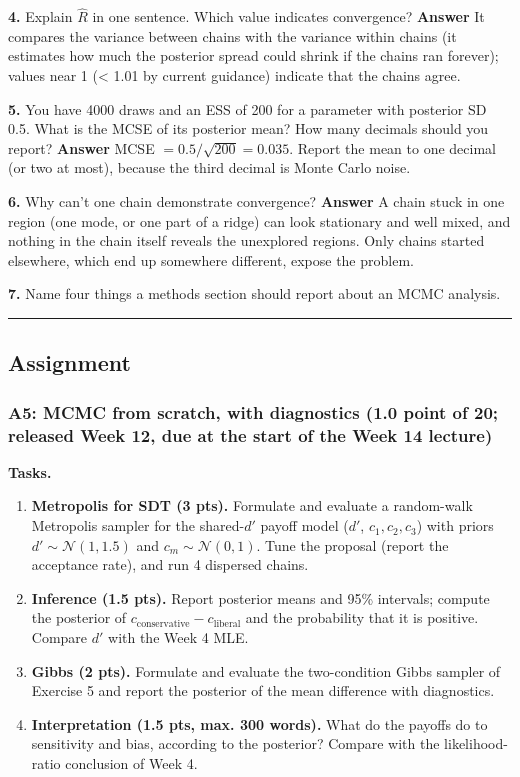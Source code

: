 \textbf{4.} Explain \(\hat R\) in one sentence. Which value indicates
convergence? \textbf{Answer} It compares the variance between chains
with the variance within chains (it estimates how much the posterior
spread could shrink if the chains ran forever); values near 1
(\textless{} 1.01 by current guidance) indicate that the chains agree.

\textbf{5.} You have 4000 draws and an ESS of 200 for a parameter with
posterior SD 0.5. What is the MCSE of its posterior mean? How many
decimals should you report? \textbf{Answer} MCSE
\(= 0.5/\sqrt{200} = 0.035\). Report the mean to one decimal (or two at
most), because the third decimal is Monte Carlo noise.

\textbf{6.} Why can't one chain demonstrate convergence? \textbf{Answer}
A chain stuck in one region (one mode, or one part of a ridge) can look
stationary and well mixed, and nothing in the chain itself reveals the
unexplored regions. Only chains started elsewhere, which end up
somewhere different, expose the problem.

\textbf{7.} Name four things a methods section should report about an
MCMC analysis.

\begin{center}\rule{0.5\linewidth}{0.5pt}\end{center}


\subsection{Assignment}

\subsubsection{A5: MCMC from scratch, with diagnostics (1.0 point of 20;
released Week 12, due at the start of the Week 14 lecture)}

\textbf{Tasks.}

\begin{enumerate}
\def\labelenumi{\arabic{enumi}.}
\tightlist
\item
  \textbf{Metropolis for SDT (3 pts).} Formulate and evaluate a random-walk
  Metropolis sampler for the shared-\(d'\) payoff model (\(d'\),
  \(c_1, c_2, c_3\)) with priors \(d' \sim \mathcal{N}(1, 1.5)\) and
  \(c_m \sim \mathcal{N}(0, 1)\). Tune the proposal (report the
  acceptance rate), and run 4 dispersed chains.
\item
  \textbf{Inference (1.5 pts).} Report posterior means and 95\%
  intervals; compute the posterior of
  \(c_{\text{conservative}} - c_{\text{liberal}}\) and the probability
  that it is positive. Compare \(d'\) with the Week 4 MLE.
\item
  \textbf{Gibbs (2 pts).} Formulate and evaluate the two-condition Gibbs sampler of
  Exercise 5 and report the posterior of the mean difference with
  diagnostics.
\item
  \textbf{Interpretation (1.5 pts, max. 300 words).} What do the payoffs
  do to sensitivity and bias, according to the posterior? Compare with
  the likelihood-ratio conclusion of Week 4.
\end{enumerate}

